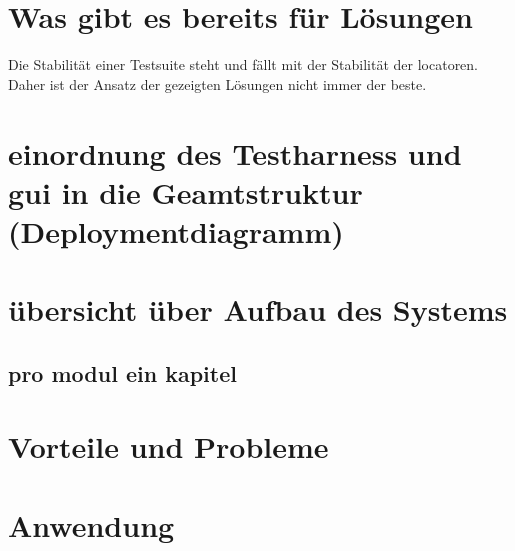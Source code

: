 \section{Was gibt es bereits für Lösungen}
Die Stabilität einer Testsuite steht und fällt mit der Stabilität der locatoren. Daher ist der Ansatz der gezeigten Lösungen nicht immer der beste.


\section{einordnung des Testharness und gui in die Geamtstruktur (Deploymentdiagramm)}

\section{übersicht über Aufbau des Systems}

\subsection{pro modul ein kapitel}

\section{Vorteile und Probleme}

\section{Anwendung}
